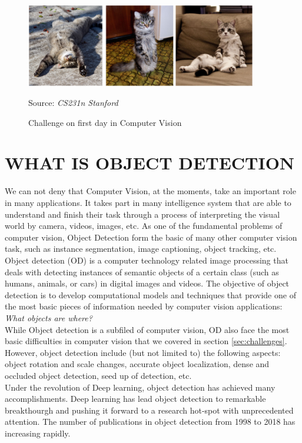 \documentclass[12pt]{article}
\newcommand{\source}[1]{\caption*{Source: \emph{#1}} }
\begin{document}
\begin{figure}[htp]
    \centering
    \includegraphics[width=0.9\textwidth]{images/cat_demo.png}
    \caption{Challenge on first day in Computer Vision }
    \label{fig:challenge}
    \source{CS231n Stanford}
\end{figure}

\section{WHAT IS OBJECT DETECTION}
We can not deny that Computer Vision, at the moments, take an important role in many 
applications. It takes part in many intelligence system that are able to understand and finish
their task through a process of interpreting the visual world by camera, videos, images, etc.
As one of the fundamental problems of computer vision, Object Detection form the basic 
of many other computer vision task, such as instance segmentation, image captioning, 
object tracking, etc. \\
Object detection (OD) is a computer technology related image processing that deals 
with detecting instances of semantic objects of a certain class (such as humans, animals, or cars) 
in digital images and videos. 
The objective of object detection is to develop computational models and techniques that provide 
one of the most basic pieces of information needed by computer vision applications:
\emph{What objects are where?} \\
While Object detection is a subfiled of computer vision, OD also face the most basic 
difficulties in computer vision that we covered in section \ref{sec:challenges}. However, 
object detection include (but not limited to) the following aspects: object rotation and
scale changes, accurate object localization, dense and occluded object detection, seed up of detection, etc. \\
Under the revolution of Deep learning, object detection has achieved many accomplishments.
Deep learning has lead object detection to remarkable breakthourgh and pushing it forward
to a research hot-spot with unprecedented attention. The number of publications
in object detection from 1998 to 2018 has increasing rapidly. \cite{zou2019object}
\end{document}
